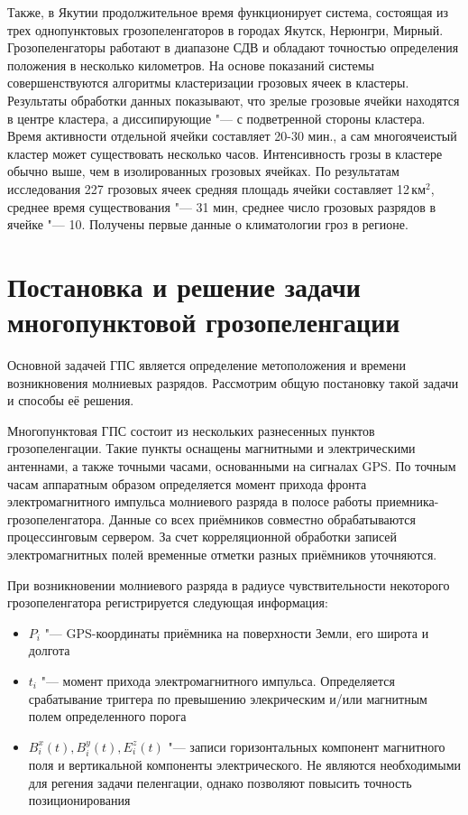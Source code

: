 Также, в Якутии продолжительное время функционирует система, состоящая из трех однопунктовых грозопеленгаторов в городах Якутск, Нерюнгри, Мирный. Грозопеленгаторы работают в диапазоне СДВ и обладают точностью определения положения в несколько километров. На основе показаний системы совершенствуются алгоритмы кластеризации грозовых ячеек в кластеры. Результаты обработки данных показывают, что зрелые грозовые ячейки находятся в центре кластера, а диссипирующие "--- с подветренной стороны кластера. Время активности отдельной ячейки составляет 20-30 мин., а сам многоячеистый кластер может существовать несколько часов. Интенсивность грозы в кластере обычно выше, чем в изолированных грозовых ячейках. По результатам исследования 227 грозовых ячеек средняя площадь ячейки составляет 12\,$\text{км}^2$, среднее время существования "--- 31 мин, среднее число грозовых разрядов в ячейке "--- 10. Получены первые данные о климатологии гроз в регионе. \cite{Shabaganova2012}

\section{Постановка и решение задачи многопунктовой грозопеленгации}
\label{sec:lds-tasks}
Основной задачей ГПС является определение метоположения и времени возникновения молниевых разрядов. Рассмотрим общую постановку такой задачи и способы её решения.

Многопунктовая ГПС состоит из нескольких разнесенных пунктов грозопеленгации. Такие пункты оснащены магнитными и электрическими антеннами, а также точными часами, основанными на сигналах GPS. По точным часам аппаратным образом определяется момент прихода фронта электромагнитного импульса молниевого разряда в полосе работы приемника-грозопеленгатора. Данные со всех приёмников совместно обрабатываются процессинговым сервером. За счет корреляционной обработки записей электромагнитных полей временные отметки разных приёмников уточняются.

При возникновении молниевого разряда в радиусе чувствительности некоторого грозопеленгатора регистрируется следующая информация:
\begin{itemize}
	\item $P_i$ "--- GPS-координаты приёмника на поверхности Земли, его широта и долгота
	\item $t_i$ "--- момент прихода электромагнитного импульса. Определяется срабатывание триггера по превышению элекрическим и/или магнитным полем определенного порога
	\item $B^x_i(t), B^y_i(t), E^z_i(t)$ "--- записи горизонтальных компонент магнитного поля и вертикальной компоненты электрического. Не являются необходимыми для регения задачи пеленгации, однако позволяют повысить точность позиционирования
\end{itemize}

